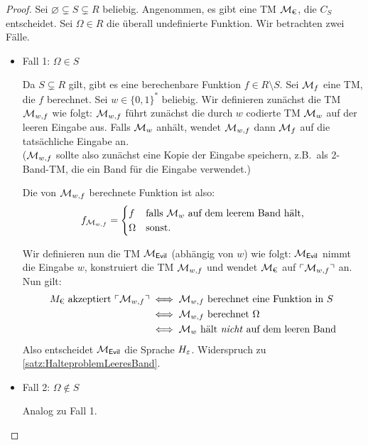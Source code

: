\begin{proof}
  Sei $\varnothing \subsetneq S \subsetneq R$ beliebig.
  Angenommen, es gibt eine \ac{TM} $\mathcal{M}_\text{€}$, die $C_S$ entscheidet.
  Sei $\Omega \in R$ die überall undefinierte Funktion. 
  Wir betrachten zwei Fälle.
  \begin{itemize}
   \item Fall 1: $\Omega \in S$
   
     Da $S\subsetneq R$ gilt, gibt es eine berechenbare Funktion $f \in R \setminus S$.
     Sei $\mathcal{M}_f$ eine \ac{TM}, die $f$ berechnet.
     Sei $w\in\{0,1\}^*$ beliebig.
     Wir definieren zunächst die \ac{TM} $\mathcal{M}_{w, f}$ wie folgt:
     $\mathcal{M}_{w, f}$ führt zunächst die durch $w$ codierte \ac{TM} $\mathcal{M}_w$ auf der leeren Eingabe aus.
     Falls $\mathcal{M}_w$ anhält, wendet $\mathcal{M}_{w, f}$ dann $\mathcal{M}_f$ auf die tatsächliche Eingabe an.\\
     ($\mathcal{M}_{w, f}$ sollte also zunächst eine Kopie der Eingabe speichern,
     z.B.\ als 2-Band-\ac{TM}, die ein Band für die Eingabe verwendet.)
     
     Die von $\mathcal{M}_{w, f}$ berechnete Funktion ist also:
     $$f_{\mathcal{M}_{w, f}}=\begin{cases}
                      f & \text{falls } \mathcal{M}_w \text{ auf dem leerem Band hält,}\\
                      \Omega & \text{sonst.}
                      \end{cases}$$
     
     Wir definieren nun die \ac{TM} $\mathcal{M}_\textsf{Evil}$ (abhängig von $w$) wie folgt:
     $\mathcal{M}_\textsf{Evil}$ nimmt die Eingabe $w$, konstruiert die \ac{TM} $\mathcal{M}_{w, f}$ und wendet $\mathcal{M}_\text{€}$ auf $\ulcorner \mathcal{M}_{w, f} \urcorner$ an.
     Nun gilt:
     \begin{align*}
      M_\text{€} \text{ akzeptiert } \godel{\M_{w, f}}
      &\iff \M_{w, f} \text{ berechnet eine Funktion in }S\\
      &\iff \M_{w, f} \text{ berechnet }\Omega\\ %
      &\iff \M_w \text{ hält \emph{nicht} auf dem leeren Band}
    \end{align*}
    Also entscheidet $\mathcal{M}_\textsf{Evil}$ die Sprache $H_\varepsilon$. Widerspruch zu \autoref{satz:HalteproblemLeeresBand}.
    \item Fall 2: $\Omega \notin S$
    
    Analog zu Fall 1. \qedhere
  \end{itemize}
\end{proof}

